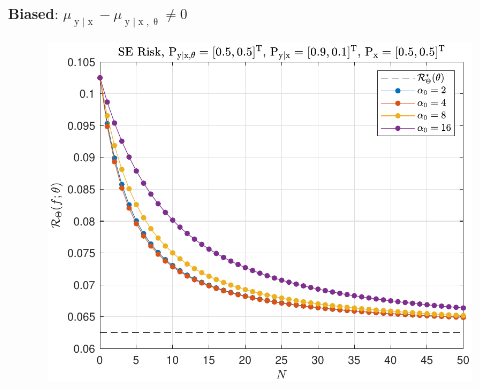 \documentclass[aspectratio=169,usenames,dvipsnames]{beamer}
\DeclareMathOperator{\xrm}{\mathrm{x}}
\DeclareMathOperator{\yrm}{\mathrm{y}}
\begin{document}
\begin{frame}
\begin{columns}[c]
\begin{column}{0.5\linewidth}
\centering
\textbf{Biased}: $\mu_{\yrm | \xrm} - \mu_{\yrm | \xrm,\uptheta} \neq 0$
%
\begin{figure}
\centering
\includegraphics[width=1\linewidth]{Risk_cond_SE_Dir_N_leg_a0_biased.pdf}
\end{figure}

\end{column}

\end{columns}

\centering
{}

\end{frame}
\end{document}

